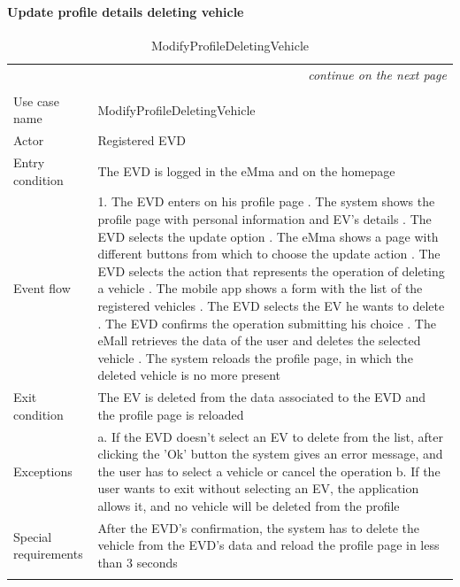 \paragraph{Update profile details deleting vehicle}
\begin{center}
    \begin{longtable}{p{4cm} p{11cm}}
    \multicolumn{2}{r}{\itshape{continue on the next page}}\\
    \endfoot 
    \\
    \endlastfoot
    \hline
     Use case name &  ModifyProfileDeletingVehicle\\
     \hline
     Actor & Registered EVD \\
     \hline
     Entry condition & The EVD is logged in the eMma and on the homepage \\
     \hline
     Event flow &   1. The EVD enters on his profile page \newline
                    2. The system shows the profile page with personal information and EV's details \newline
                    3. The EVD selects the update option \newline 
                    4. The eMma shows a page with different buttons from which to choose the update action \newline
                    5. The EVD selects the action that represents the operation of deleting  a vehicle \newline
                    6. The mobile app shows a form with the list of the registered vehicles \newline
                    7. The EVD selects the EV he wants to delete \newline
                    8. The EVD confirms the operation submitting his choice \newline
                    9. The eMall retrieves the data of the user and deletes the selected vehicle \newline
                    10. The system reloads the profile page, in which the deleted vehicle is no more present \\
     \hline
     Exit condition &  The EV is deleted from the data associated to the EVD and the profile page is reloaded \\
     \hline
     Exceptions &  
        a. If the EVD doesn't select an EV to delete from the list, after clicking the 'Ok' button the system gives an error message, and the user has to select a vehicle or cancel the operation\newline
        b. If the user wants to exit without selecting an EV, the application allows it, and no vehicle will be deleted from the profile\\
     \hline
     Special requirements &  After the EVD's confirmation, the system has to delete the vehicle from the EVD's data and reload the profile page in less than 3 seconds \\
     \hline
    \caption{ModifyProfileDeletingVehicle}
    \label{tab:ModifyProfileDeletingVehicle}
    \end{longtable}
\end{center}

